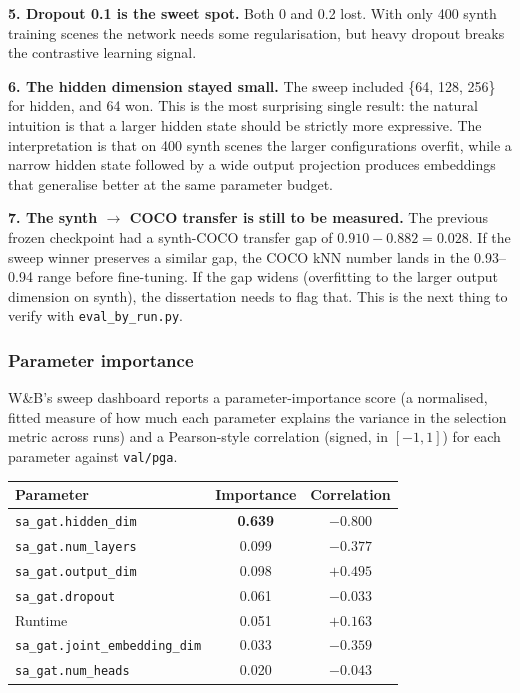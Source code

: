 \textbf{5. Dropout 0.1 is the sweet spot.} Both 0 and 0.2 lost. With only 400 synth training scenes the network needs some regularisation, but heavy dropout breaks the contrastive learning signal.

\textbf{6. The hidden dimension stayed small.} The sweep included \{64, 128, 256\} for hidden, and 64 won. This is the most surprising single result: the natural intuition is that a larger hidden state should be strictly more expressive. The interpretation is that on 400 synth scenes the larger configurations overfit, while a narrow hidden state followed by a wide output projection produces embeddings that generalise better at the same parameter budget.

\textbf{7. The synth $\rightarrow$ COCO transfer is still to be measured.} The previous frozen checkpoint had a synth-COCO transfer gap of $0.910 - 0.882 = 0.028$. If the sweep winner preserves a similar gap, the COCO kNN number lands in the 0.93--0.94 range before fine-tuning. If the gap widens (overfitting to the larger output dimension on synth), the dissertation needs to flag that. This is the next thing to verify with \texttt{eval\_by\_run.py}.

\subsubsection{Parameter importance}

W\&B's sweep dashboard reports a parameter-importance score (a normalised, fitted measure of how much each parameter explains the variance in the selection metric across runs) and a Pearson-style correlation (signed, in $[-1, 1]$) for each parameter against \texttt{val/pga}.

\begin{tabular}{lcc}
\hline
\textbf{Parameter} & \textbf{Importance} & \textbf{Correlation} \\
\hline
\texttt{sa\_gat.hidden\_dim}          & \textbf{0.639} & $-0.800$ \\
\texttt{sa\_gat.num\_layers}          & 0.099 & $-0.377$ \\
\texttt{sa\_gat.output\_dim}          & 0.098 & $+0.495$ \\
\texttt{sa\_gat.dropout}              & 0.061 & $-0.033$ \\
Runtime                                & 0.051 & $+0.163$ \\
\texttt{sa\_gat.joint\_embedding\_dim}& 0.033 & $-0.359$ \\
\texttt{sa\_gat.num\_heads}           & 0.020 & $-0.043$ \\
\hline
\end{tabular}

